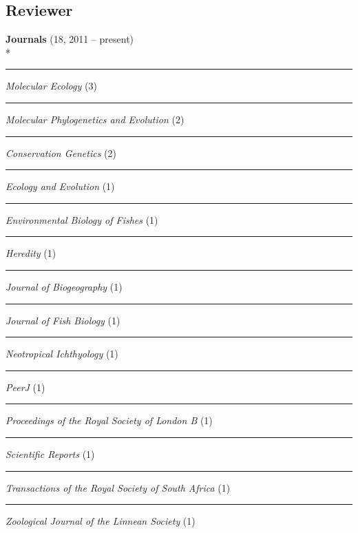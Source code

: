 \documentclass[margin,line]{res}
\begin{document}
\begin{resume}

\section{\sc Reviewer}
\textbf{Journals} (18, 2011 -- present)\\*
\rule{-1mm}{5mm} \hspace*{4mm} \textit{Molecular Ecology} (3) \\
\rule{-1mm}{5mm} \hspace*{4mm} \textit{Molecular Phylogenetics and Evolution} (2) \\
\rule{-1mm}{5mm} \hspace*{4mm} \textit{Conservation Genetics} (2) \\
\rule{-1mm}{5mm} \hspace*{4mm} \textit{Ecology and Evolution} (1) \\
\rule{-1mm}{5mm} \hspace*{4mm} \textit{Environmental Biology of Fishes} (1) \\
\rule{-1mm}{5mm} \hspace*{4mm} \textit{Heredity} (1) \\
\rule{-1mm}{5mm} \hspace*{4mm} \textit{Journal of Biogeography} (1) \\
\rule{-1mm}{5mm} \hspace*{4mm} \textit{Journal of Fish Biology} (1) \\
\rule{-1mm}{5mm} \hspace*{4mm} \textit{Neotropical Ichthyology} (1) \\
\rule{-1mm}{5mm} \hspace*{4mm} \textit{PeerJ} (1) \\
\rule{-1mm}{5mm} \hspace*{4mm} \textit{Proceedings of the Royal Society of London B} (1) \\
\rule{-1mm}{5mm} \hspace*{4mm} \textit{Scientific Reports} (1) \\
\rule{-1mm}{5mm} \hspace*{4mm} \textit{Transactions of the Royal Society of South Africa} (1) \\
\rule{-1mm}{5mm} \hspace*{4mm} \textit{Zoological Journal of the Linnean Society} (1) \\




\end{resume}
\end{document}
